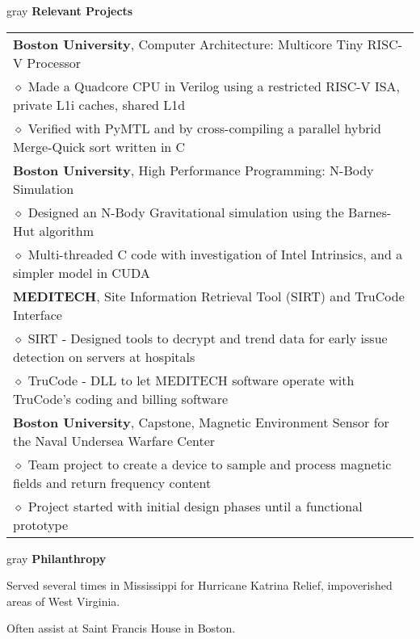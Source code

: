 \documentclass[10.5pt,letterpaper]{article}
\newcommand{\org}[1]{\textbf{#1}}
\newcommand{\pseudoitem}{\diamond}
\newcommand{\vertspace}{\vspace{1.2mm}}
\newcommand{\minorindent}{\hspace{4.5mm}}
\newcommand{\minoritem}{\minorindent $\pseudoitem$ }
\newcommand{\tablewidth}{.9\linewidth}
\newcommand{\undergrad}{Boston University}
\newcommand{\grad}{Boston University}
\begin{document}
	\vertspace
	\noindent
	\begin{heading}{gray}
		\textbf{Relevant Projects}
	\end{heading}
	\begin{tabular*}{\tablewidth}{@{\extracolsep{\fill}}l}
		\org{\grad}, Computer Architecture: Multicore Tiny RISC-V Processor\\
		\minoritem Made a Quadcore CPU in Verilog using a restricted RISC-V ISA, private L1i caches, shared L1d\\
		\minoritem Verified with PyMTL and by cross-compiling a parallel hybrid Merge-Quick sort written in C\\
		\org{\grad}, High Performance Programming: N-Body Simulation\\
		\minoritem Designed an N-Body Gravitational simulation using the Barnes-Hut algorithm\\
		\minoritem Multi-threaded C code with investigation of Intel Intrinsics, and a simpler model in CUDA\\
		\org{MEDITECH}, Site Information Retrieval Tool (SIRT) and TruCode Interface\\
		\minoritem SIRT - Designed tools to decrypt and trend data for early issue detection on servers at hospitals\\
		\minoritem TruCode - DLL to let MEDITECH software operate with TruCode's coding and billing software\\
		\org{\undergrad}, Capstone, Magnetic Environment Sensor for the Naval Undersea Warfare Center\\
		\minoritem Team project to create a device to sample and process magnetic fields and return frequency content\\
		\minoritem Project started with initial design phases until a functional prototype\\
	\end{tabular*}
	

	
	\vertspace
	\noindent
	\begin{heading}{gray}
		\textbf{Philanthropy}
	\end{heading}
	Served several times in Mississippi for Hurricane Katrina Relief, impoverished areas of West Virginia.
	
	Often assist at Saint Francis House in Boston.
\end{document}
